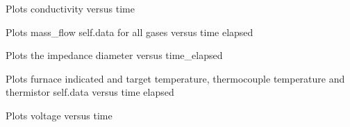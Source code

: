 \documentclass[letterpaper,10pt,english]{sphinxmanual}
\begin{document}
\begin{fulllineitems}

\begin{fulllineitems}
\label{\detokenize{plotting:plotting.LabPlots.cond_time}}
Plots conductivity versus time

\end{fulllineitems}


\begin{fulllineitems}
\label{\detokenize{plotting:plotting.LabPlots.gas}}
Plots mass\_flow self.data for all gases versus time elapsed

\end{fulllineitems}


\begin{fulllineitems}
\label{\detokenize{plotting:plotting.LabPlots.imp_diameter}}
Plots the impedance diameter versus time\_elapsed

\end{fulllineitems}


\begin{fulllineitems}
\label{\detokenize{plotting:plotting.LabPlots.temperature}}
Plots furnace indicated and target temperature, thermocouple temperature and thermistor self.data versus time elapsed

\end{fulllineitems}


\begin{fulllineitems}
\label{\detokenize{plotting:plotting.LabPlots.voltage}}
Plots voltage versus time

\end{fulllineitems}


\end{fulllineitems}
\end{document}
